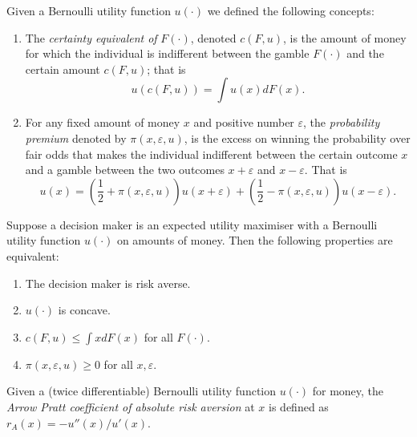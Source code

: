 \begin{defn}
    Given a Bernoulli utility function $u(\cdot)$ we defined the following concepts:
    \begin{enumerate}
        \item The \emph{certainty equivalent of} $F(\cdot)$, denoted $c(F, u)$, is the amount of money for which the individual is indifferent between the gamble $F(\cdot)$ and the certain amount $c(F, u)$; that is 
        \begin{equation*}
            u\left(c(F, u)\right) = \int u(x) dF(x).
        \end{equation*}

        \item For any fixed amount of money $x$ and positive number $\varepsilon$, the \emph{probability premium} denoted by $\pi(x, \varepsilon, u)$, is the excess on winning the probability over fair odds that makes the individual indifferent between the certain outcome $x$ and a gamble between the two outcomes $x + \varepsilon$ and $x - \varepsilon$. That is 
        \begin{equation*}
            u(x) = \left( \frac{1}{2} + \pi(x, \varepsilon, u)\right) u(x + \varepsilon) + \left( \frac{1}{2} - \pi(x, \varepsilon, u)\right) u(x - \varepsilon).
        \end{equation*}
    \end{enumerate}
\end{defn}

\begin{prop}
    Suppose a decision maker is an expected utility maximiser with a Bernoulli utility function $u(\cdot)$ on amounts of money. Then the following properties are equivalent:
    \begin{enumerate}
        \item The decision maker is risk averse.
        \item $u(\cdot)$ is concave.
        \item $c(F, u) \leq \int x dF(x)$ for all $F(\cdot)$.
        \item $\pi(x, \varepsilon, u) \geq 0$ for all $x, \varepsilon$.
    \end{enumerate}
\end{prop}

\begin{defn}
    Given a (twice differentiable) Bernoulli utility function $u(\cdot)$ for money, the \emph{Arrow Pratt coefficient of absolute risk aversion} at $x$ is defined as $r_A(x) = -u''(x) / u'(x)$.
\end{defn}


